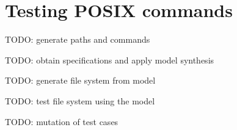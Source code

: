 
\section{Testing POSIX commands}
\label{sec:testing}

TODO: generate paths and commands

TODO: obtain specifications and apply model synthesis

TODO: generate file system from model

TODO: test file system using the model

TODO: mutation of test cases

